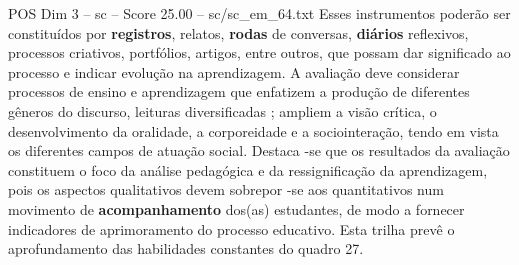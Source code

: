 \begin{textsample}{POS Dim 3 – sc – Score 25.00 – sc/sc\_em\_64.txt}
Esses instrumentos poderão ser constituídos por \textbf{registros}, relatos, \textbf{rodas} de conversas, \textbf{diários} reflexivos, processos criativos, portfólios, artigos, entre outros, que possam dar significado ao processo e indicar evolução na aprendizagem.
A avaliação deve considerar processos de ensino e aprendizagem que enfatizem a produção de diferentes gêneros do discurso, leituras diversificadas ; ampliem a visão crítica, o desenvolvimento da oralidade, a corporeidade e a sociointeração, tendo em vista os diferentes campos de atuação social.
Destaca -se que os resultados da avaliação constituem o foco da análise pedagógica e da ressignificação da aprendizagem, pois os aspectos qualitativos devem sobrepor -se aos quantitativos num movimento de \textbf{acompanhamento} dos(as) estudantes, de modo a fornecer indicadores de aprimoramento do processo educativo.
Esta trilha prevê o aprofundamento das habilidades constantes do quadro 27.

\end{textsample}
